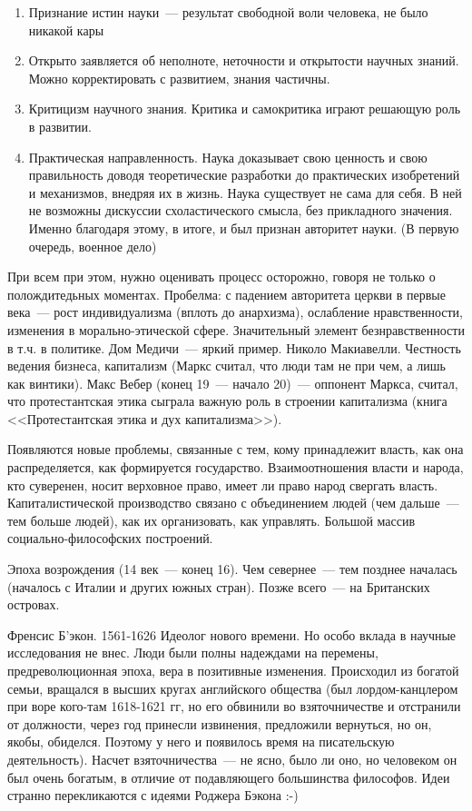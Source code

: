 \begin{enumerate}
	\item Признание истин науки~--- результат свободной воли человека, не было никакой кары
	\item Открыто заявляется об неполноте, неточности и открытости научных знаний. Можно корректировать с развитием, знания частичны.
	\item Критицизм научного знания. Критика и самокритика играют решающую роль в развитии.
	\item Практическая направленность. Наука доказывает свою ценность и свою правильность доводя теоретические разработки до практических изобретений и механизмов, внедряя их в жизнь. Наука существует не сама для себя. В ней не возможны дискуссии схоластического смысла, без прикладного значения. Именно благодаря этому, в итоге, и был признан авторитет науки. (В первую очередь, военное дело)
\end{enumerate}
При всем при этом, нужно оценивать процесс осторожно, говоря не только о полождитедьных моментах. Пробелма: с падением авторитета церкви в первые века~--- рост индивидуализма (вплоть до анархизма), ослабление нравственности, изменения в морально-этической сфере. Значительный элемент безнравственности в т.ч. в политике. Дом Медичи~--- яркий пример. Николо Макиавелли.
Честность ведения бизнеса, капитализм (Маркс считал, что люди там не при чем, а лишь как винтики). Макс Вебер (конец 19~--- начало 20)~--- оппонент Маркса, считал, что протестантская этика сыграла важную роль в строении капитализма (книга <<Протестантская этика и дух капитализма>>).

Появляются новые проблемы, связанные с тем, кому принадлежит власть, как она распределяется, как формируется государство. Взаимоотношения власти и народа, кто суверенен, носит верховное право, имеет ли право народ свергать власть. Капиталистической производство связано с объединением людей (чем дальше~--- тем больше людей), как их организовать, как управлять. Большой массив социально-философских построений.

Эпоха возрождения (14 век~--- конец 16). Чем севернее~--- тем позднее началась (началось с Италии и других южных стран). Позже всего~--- на Британских островах.

Френсис Б'экон. 1561-1626
Идеолог нового времени. Но особо вклада в научные исследования не внес. Люди были полны надеждами на перемены, предреволюционная эпоха, вера в позитивные изменения. Происходил из богатой семьи, вращался в высших кругах английского общества (был лордом-канцлером при воре кого-там 1618-1621 гг, но его обвинили во взяточничестве и отстранили от должности, через год принесли извинения, предложили вернуться, но он, якобы, обиделся. Поэтому у него и появилось время на писательскую деятельность). Насчет взяточничества~--- не ясно, было ли оно, но человеком он был очень богатым, в отличие от подавляющего большинства философов. Идеи странно перекликаются с идеями Роджера Бэкона :-)

